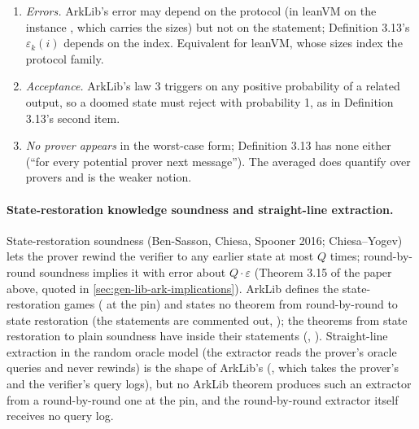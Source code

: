 \begin{enumerate}
  intermediate witnesses. When all intermediate witnesses are trivial (every leanVM phase after the
  commit has ), ArkLib's knowledge state function is a transcript
  predicate and the notion is round-by-round \emph{soundness} of the verifier with respect to the
  seams, which is exactly what a phase over an already committed oracle can offer.
\item \emph{Errors.} ArkLib's error  may depend on the protocol (in
  leanVM on the instance , which carries the sizes) but not on the statement;
  Definition 3.13's $\varepsilon_k(i)$ depends on the index. Equivalent for leanVM, whose sizes
  index the protocol family.
\item \emph{Acceptance.} ArkLib's law 3 triggers on any positive probability of a related output,
  so a doomed state must reject with probability 1, as in Definition 3.13's second item.
\item \emph{No prover appears} in the worst-case form; Definition 3.13 has none either (\enquote{for
  every potential prover next message}). The averaged  does quantify
  over provers and is the weaker notion.
\end{enumerate}

\paragraph{State-restoration knowledge soundness and straight-line extraction.} State-restoration
soundness (Ben-Sasson, Chiesa, Spooner 2016; Chiesa--Yogev) lets the prover rewind the verifier to
any earlier state at most $Q$ times; round-by-round soundness implies it with error about
$Q \cdot \varepsilon$ (Theorem 3.15 of the paper above, quoted in
\cref{sec:gen-lib-ark-implications}). ArkLib defines the state-restoration games
(\allowbreak{} at the pin) and states no theorem from
round-by-round to state restoration (the statements are commented out,
\allowbreak{}); the theorems from state restoration to plain soundness
have  inside their statements (, ). Straight-line extraction in
the random oracle model (the extractor reads the prover's oracle queries and never rewinds) is the
shape of ArkLib's  (\allowbreak{}, which takes
the prover's and the verifier's query logs), but no ArkLib theorem produces such an extractor from
a round-by-round one at the pin, and the round-by-round extractor itself receives no query log.

